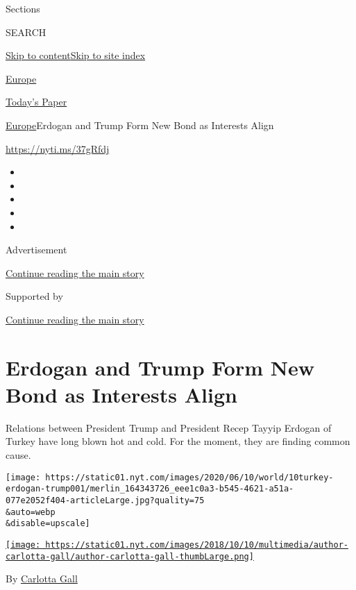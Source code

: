 Sections

SEARCH

\protect\hyperlink{site-content}{Skip to
content}\protect\hyperlink{site-index}{Skip to site index}

\href{https://www.nytimes.com/section/world/europe}{Europe}

\href{https://myaccount.nytimes.com/auth/login?response_type=cookie\&client_id=vi}{}

\href{https://www.nytimes.com/section/todayspaper}{Today's Paper}

\href{/section/world/europe}{Europe}\textbar{}Erdogan and Trump Form New
Bond as Interests Align

\url{https://nyti.ms/37gRfdj}

\begin{itemize}
\item
\item
\item
\item
\item
\end{itemize}

Advertisement

\protect\hyperlink{after-top}{Continue reading the main story}

Supported by

\protect\hyperlink{after-sponsor}{Continue reading the main story}

\hypertarget{erdogan-and-trump-form-new-bond-as-interests-align}{%
\section{Erdogan and Trump Form New Bond as Interests
Align}\label{erdogan-and-trump-form-new-bond-as-interests-align}}

Relations between President Trump and President Recep Tayyip Erdogan of
Turkey have long blown hot and cold. For the moment, they are finding
common cause.

\texttt{[image: https://static01.nyt.com/images/2020/06/10/world/10turkey-erdogan-trump001/merlin\_164343726\_eee1c0a3-b545-4621-a51a-077e2052f404-articleLarge.jpg?quality=75\\\&auto=webp\\\&disable=upscale]}

\href{https://www.nytimes.com/by/carlotta-gall}{\texttt{[image: https://static01.nyt.com/images/2018/10/10/multimedia/author-carlotta-gall/author-carlotta-gall-thumbLarge.png]}}

By \href{https://www.nytimes.com/by/carlotta-gall}{Carlotta Gall}

